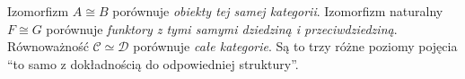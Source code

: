 \begin{uwaga}
Izomorfizm $A\cong B$ porównuje \emph{obiekty tej samej kategorii}. Izomorfizm naturalny $F\cong G$ porównuje \emph{funktory z tymi samymi dziedziną i przeciwdziedziną}. Równoważność $\mathcal C\simeq\mathcal D$ porównuje \emph{całe kategorie}. Są to trzy różne poziomy pojęcia ``to samo z dokładnością do odpowiedniej struktury''.
\end{uwaga}

